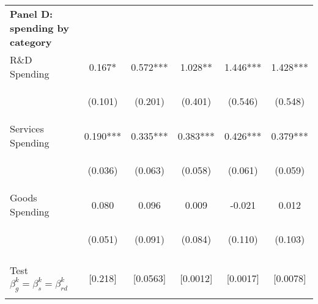 \begin{tabular}{lccccc}
     \multicolumn{1}{l}{\textbf{Panel D: spending by category}} & & & & \\
    R\&D Spending & 0.167* & 0.572*** & 1.028** & 1.446*** & 1.428*** \\
    \vspace{4pt} & \begin{footnotesize}(0.101)\end{footnotesize} & \begin{footnotesize}(0.201)\end{footnotesize} & \begin{footnotesize}(0.401)\end{footnotesize} & \begin{footnotesize}(0.546)\end{footnotesize} & \begin{footnotesize}(0.548)\end{footnotesize} \\
    Services Spending & 0.190*** & 0.335*** & 0.383*** & 0.426*** & 0.379*** \\
    \vspace{4pt} & \begin{footnotesize}(0.036)\end{footnotesize} & \begin{footnotesize}(0.063)\end{footnotesize} & \begin{footnotesize}(0.058)\end{footnotesize} & \begin{footnotesize}(0.061)\end{footnotesize} & \begin{footnotesize}(0.059)\end{footnotesize} \\
    Goods Spending & 0.080 & 0.096 & 0.009 & -0.021 & 0.012 \\
    & \begin{footnotesize}(0.051)\end{footnotesize} & \begin{footnotesize}(0.091)\end{footnotesize} & \begin{footnotesize}(0.084)\end{footnotesize} & \begin{footnotesize}(0.110)\end{footnotesize} & \begin{footnotesize}(0.103)\end{footnotesize} \\
    \\
    Test $\beta^k_g=\beta^k_s=\beta^k_{rd}$  &  [0.218]  & [0.0563] & [0.0012] & [0.0017] & [0.0078] \\
   \\
                                       

\end{tabular}
